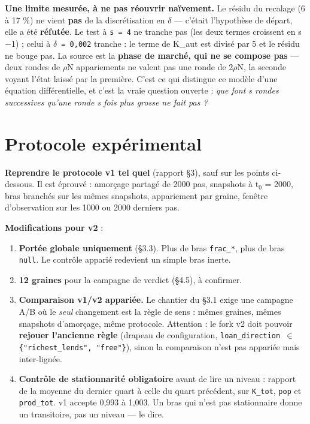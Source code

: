 \documentclass[11pt,a4paper]{article}
\newcommand{\code}[1]{\texttt{#1}}
\begin{document}
\textbf{Une limite mesurée, à ne pas réouvrir naïvement.} Le résidu du recalage (6 à 17 \%) ne vient \textbf{pas} de la discrétisation en \ensuremath{\delta} --- c'était l'hypothèse de départ, elle a été \textbf{réfutée}. Le test à \code{s = 4} ne tranche pas (les deux termes croissent en s\ensuremath{-}1) ; celui à \code{\ensuremath{\delta} = 0,002} tranche : le terme de K\_aut est divisé par 5 et le résidu ne bouge pas. La source est la \textbf{phase de marché, qui ne se compose pas} --- deux rondes de \ensuremath{\rho}N appariements ne valent pas une ronde de 2\ensuremath{\rho}N, la seconde voyant l'état laissé par la première. C'est ce qui distingue ce modèle d'une équation différentielle, et c'est la vraie question ouverte : \emph{que font s rondes successives qu'une ronde s fois plus grosse ne fait pas ?}

\bigskip

\setcounter{section}{6}
\section{Protocole expérimental}

\textbf{Reprendre le protocole v1 tel quel} (rapport §3), sauf sur les points ci-dessous. Il est éprouvé : amorçage partagé de 2000 pas, snapshots à t\ensuremath{_0} = 2000, bras branchés sur les mêmes snapshots, appariement par graine, fenêtre d'observation sur les 1000 ou 2000 derniers pas.

\textbf{Modifications pour v2} :

\begin{enumerate}
\item \textbf{Portée globale uniquement} (§3.3). Plus de bras \code{frac\_*}, plus de bras \code{null}. Le contrôle apparié redevient un simple bras inerte.
\item \textbf{12 graines} pour la campagne de verdict (§4.5), à confirmer.
\item \textbf{Comparaison v1/v2 appariée.} Le chantier du §3.1 exige une campagne A/B où le \emph{seul} changement est la règle de sens : mêmes graines, mêmes snapshots d'amorçage, même protocole. Attention : le fork v2 doit pouvoir \textbf{rejouer l'ancienne règle} (drapeau de configuration, \code{loan\_direction \ensuremath{\in} \{"richest\_lends", "free"\}}), sinon la comparaison n'est pas appariée mais inter-lignée.
\item \textbf{Contrôle de stationnarité obligatoire} avant de lire un niveau : rapport de la moyenne du dernier quart à celle du quart précédent, sur \code{K\_tot}, \code{pop} et \code{prod\_tot}. v1 accepte 0,993 à 1,003. Un bras qui n'est pas stationnaire donne un transitoire, pas un niveau --- le dire.
\end{enumerate}
\end{document}
